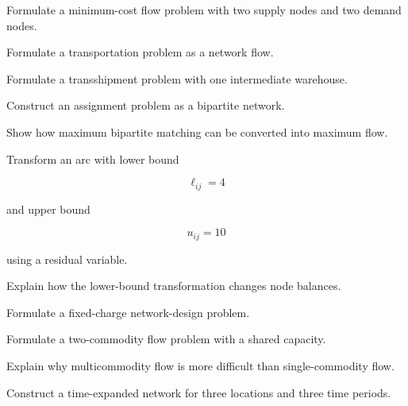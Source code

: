 \begin{exercise}[3]
Formulate a minimum-cost flow problem with two supply nodes and two demand
nodes.
\end{exercise}

\begin{exercise}[3]
Formulate a transportation problem as a network flow.
\end{exercise}

\begin{exercise}[3]
Formulate a transshipment problem with one intermediate warehouse.
\end{exercise}

\begin{exercise}[3]
Construct an assignment problem as a bipartite network.
\end{exercise}

\begin{exercise}[3]
Show how maximum bipartite matching can be converted into maximum flow.
\end{exercise}

\begin{exercise}[3]
Transform an arc with lower bound

\[
\ell_{ij}=4
\]

and upper bound

\[
u_{ij}=10
\]

using a residual variable.
\end{exercise}

\begin{exercise}[3]
Explain how the lower-bound transformation changes node balances.
\end{exercise}

\begin{exercise}[3]
Formulate a fixed-charge network-design problem.
\end{exercise}

\begin{exercise}[3]
Formulate a two-commodity flow problem with a shared capacity.
\end{exercise}

\begin{exercise}[3]
Explain why multicommodity flow is more difficult than single-commodity
flow.
\end{exercise}

\begin{exercise}[3]
Construct a time-expanded network for three locations and three time
periods.
\end{exercise}

